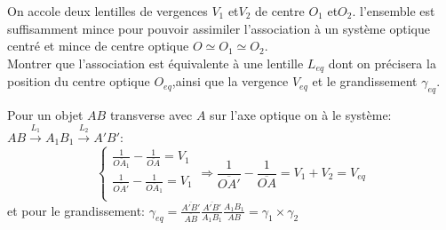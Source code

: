 \begin{Exercise}[title=Formule des opticiens]
On accole deux lentilles de vergences $V_1$ et$V_2$ de centre $O_1$ et$O_2$. l'ensemble est suffisamment mince pour pouvoir assimiler l'association à un système optique centré et mince de centre optique $O \simeq O_1 \simeq O_2$.\\
Montrer que l'association est équivalente à une lentille $L_{eq}$ dont on précisera la position du centre optique $O_{eq}$,ainsi que la vergence $V_{eq}$ et le grandissement $\gamma_{eq}$.
\end{Exercise}
\begin{Answer}
Pour un objet $AB$ transverse avec $A$ sur l'axe optique on à le système: \\
$AB \xrightarrow{L_1} A_1 B_1 \xrightarrow{L_2} A'B'$:
\[
\left\lbrace
\begin{array}{l}
\frac{1}{\overline{OA_1}}-\frac{1}{\overline{O A}} = V_1 \\
\frac{1}{\overline{OA'}}-\frac{1}{\overline{OA_1}} = V_1 \\
\end{array}\right. \Longrightarrow  \frac{1}{\overline{OA'}}-\frac{1}{\overline{OA}} = V_1+V_2= V_{eq}
\]
et pour le grandissement: $\gamma_{eq}=\frac{\overline{A'B'}}{\overline{AB}} \frac{\overline{A'B'}}{A_1 B_1}\frac{A_1 B_1}{AB}=\gamma_1 \times \gamma_2 $
\end{Answer}
